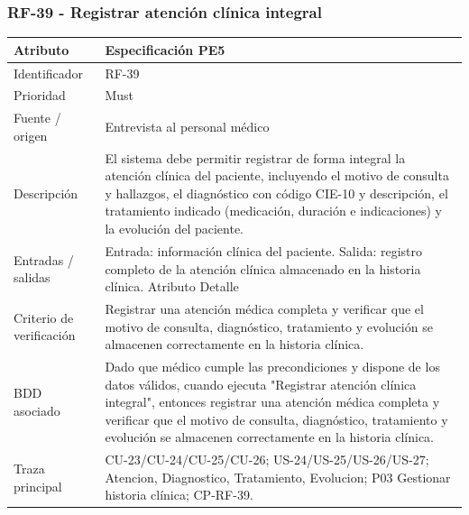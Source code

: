\documentclass[11pt,a4paper]{article}
\begin{document}
	\subsubsection{RF-39 - Registrar atención clínica integral}
	\begin{tabularx}{\textwidth}{p{3.2cm}Y}
		\toprule
		\textbf{Atributo} & \textbf{Especificación PE5}\\\midrule
		Identificador & RF-39\\
		Prioridad & Must\\
		Fuente / origen & Entrevista al personal médico\\
		Descripción & El sistema debe permitir registrar de forma integral la atención clínica del paciente, incluyendo el motivo de consulta y hallazgos, el diagnóstico con código CIE-10 y descripción, el tratamiento indicado (medicación, duración e indicaciones) y la evolución del paciente.\\
		Entradas / salidas & Entrada: información clínica del paciente. Salida: registro completo de la atención clínica almacenado en la historia clínica. Atributo Detalle\\
		Criterio de verificación & Registrar una atención médica completa y verificar que el motivo de consulta, diagnóstico, tratamiento y evolución se almacenen correctamente en la historia clínica.\\
		BDD asociado & Dado que médico cumple las precondiciones y dispone de los datos válidos, cuando ejecuta "Registrar atención clínica integral", entonces registrar una atención médica completa y verificar que el motivo de consulta, diagnóstico, tratamiento y evolución se almacenen correctamente en la historia clínica.\\
		Traza principal & CU-23/CU-24/CU-25/CU-26; US-24/US-25/US-26/US-27; Atencion, Diagnostico, Tratamiento, Evolucion; P03 Gestionar historia clínica; CP-RF-39.\\
		\bottomrule
	\end{tabularx}
\end{document}
